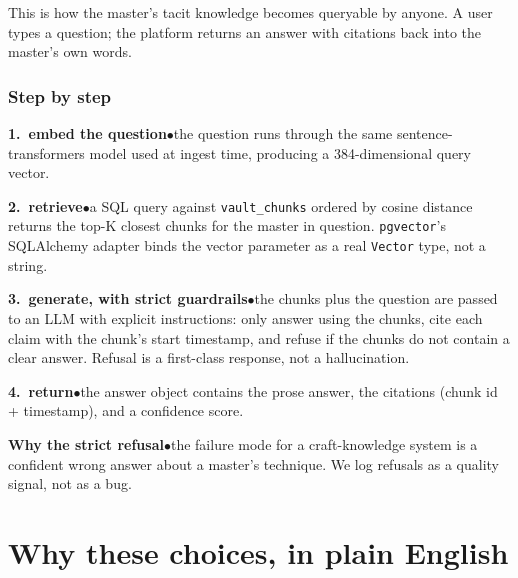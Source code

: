 \documentclass[11pt,a4paper]{article}
\newcommand{\stack}[2]{%
  \par\noindent\textbf{\color{walnut}#1}\hspace{0.5em}\textcolor{rouge}{$\bullet$}\hspace{0.5em}\textcolor{faded}{#2}\par
}
\begin{document}
This is how the master's tacit knowledge becomes queryable by anyone.
A user types a question; the platform returns an answer with citations
back into the master's own words.

\subsubsection*{Step by step}

\stack{1.\ embed the question}{the question runs through the same
sentence-transformers model used at ingest time, producing a
384-dimensional query vector.}
\stack{2.\ retrieve}{a SQL query against \texttt{vault\_chunks} ordered
by cosine distance returns the top-K closest chunks for the master in
question. \texttt{pgvector}'s SQLAlchemy adapter binds the vector
parameter as a real \texttt{Vector} type, not a string.}
\stack{3.\ generate, with strict guardrails}{the chunks plus the
question are passed to an LLM with explicit instructions: only answer
using the chunks, cite each claim with the chunk's start timestamp,
and refuse if the chunks do not contain a clear answer. Refusal is a
first-class response, not a hallucination.}
\stack{4.\ return}{the answer object contains the prose answer, the
citations (chunk id + timestamp), and a confidence score.}

\stack{Why the strict refusal}{the failure mode for a craft-knowledge
system is a confident wrong answer about a master's technique. We log
refusals as a quality signal, not as a bug.}

\section{Why these choices, in plain English}
\end{document}
